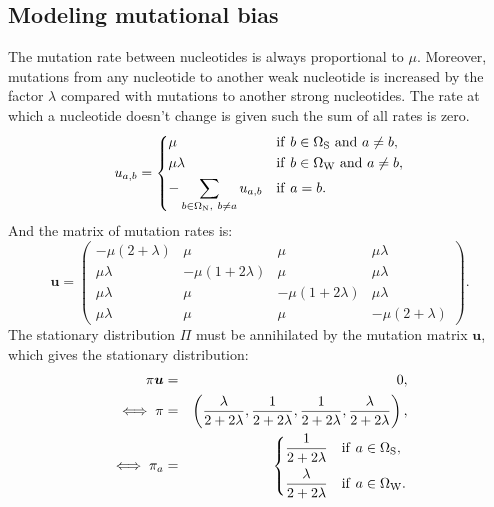 \documentclass{article}
\newcommand{\SetNuc}{\Omega_{\mathrm{N}}}
\newcommand{\SetWeak}{\Omega_{\mathrm{W}}}
\newcommand{\SetStrong}{\Omega_{\mathrm{S}}}
\begin{document}
    \subsection{Modeling mutational bias}
    \label{sec:mutBias}
    The mutation rate between nucleotides is always proportional to $\mu$. Moreover, mutations from any nucleotide to another weak nucleotide is increased by the factor $\lambda$ compared with mutations to another strong nucleotides. The rate at which a nucleotide doesn't change is given such the sum of all rates is zero.
    \begin{equation}
        \label{nucRates}
        u_{a, b} =
        \begin{dcases}
            \mu
            & \mathrm{if} \ b \in \SetStrong \ \mathrm{ and } \ a \neq b, \\
            \mu \lambda
            & \mathrm{if} \ b \in  \SetWeak \ \mathrm{ and } \ a \neq b,  \\
            - \sum_{b \in \SetNuc, \ b \neq a }  u_{a, b}
            & \mathrm{if} \ a = b.
        \end{dcases}
    \end{equation}
    And the matrix of mutation rates is:
    \begin{equation}
        \label{nucMatrix}
        \bm{u} =
        \begin{pmatrix}
            {-\mu(2 + \lambda)} & {\mu} & {\mu} & {\mu \lambda} \\
            {\mu \lambda} & {-\mu(1 + 2\lambda)} & {\mu} & {\mu \lambda} \\
            {\mu \lambda} & {\mu} & {-\mu(1 + 2\lambda)} & {\mu \lambda} \\
            {\mu \lambda} & {\mu} & {\mu} & {-\mu(2 + \lambda)}
        \end{pmatrix}.
    \end{equation}
    The stationary distribution $\Pi$ must be annihilated by the mutation matrix $\bm{u}$, which gives the stationary distribution:
    \begin{eqnarray}
        \pi \bm{u}
        & = & 0, \\
        \iff \pi
        & = & \left( \dfrac{\lambda}{2+2\lambda}, \dfrac{1}{2+2\lambda}, \dfrac{1}{2+2\lambda}, \dfrac{\lambda}{2+2\lambda} \right), \\
        \iff \pi_a
        & = &
        \begin{dcases}
            \dfrac{1}{2+2\lambda} & \mathrm{if} \ a \in \SetStrong, \\
            \dfrac{\lambda}{2+2\lambda} & \mathrm{if} \ a \in  \SetWeak.  \\
        \end{dcases}
        \label{nucStationarity}
    \end{eqnarray}
\end{document}
